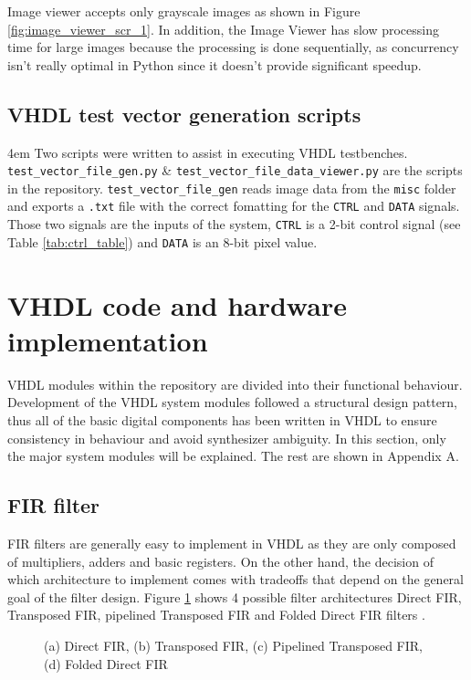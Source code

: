 Image viewer accepts only grayscale images as shown in Figure \ref{fig:image_viewer_scr_1}. In addition, the Image Viewer has slow processing time for large images because the processing is done sequentially, as concurrency isn't really optimal in Python since it doesn't provide significant speedup.


\subsection{VHDL test vector generation scripts}
\emergencystretch 4em%
    {\sloppy
        Two scripts were written to assist in executing VHDL testbenches. \lstinline{test_vector_file_gen.py} \& \lstinline{test_vector_file_data_viewer.py} are the scripts in the repository. \lstinline{test_vector_file_gen} reads image data from the \lstinline{misc} folder and exports a \lstinline{.txt} file with the correct fomatting for the \lstinline{CTRL} and \lstinline{DATA} signals. Those two signals are the inputs of the system, \lstinline{CTRL} is a 2-bit control signal (see Table \ref{tab:ctrl_table}) and \lstinline{DATA} is an 8-bit pixel value.
}

\section{VHDL code and hardware implementation}

VHDL modules within the repository are divided into their functional behaviour. Development of the VHDL system modules followed a structural design pattern, thus all of the basic digital components has been written in VHDL to ensure consistency in behaviour and avoid synthesizer ambiguity. In this section, only the major system modules will be explained. The rest are shown in Appendix A.

\subsection{FIR filter}
FIR filters are generally easy to implement in VHDL as they are only composed of multipliers, adders and basic registers. On the other hand, the decision of which architecture to implement comes with tradeoffs that depend on the general goal of the filter design. Figure \ref{fig:fir_filter_architectures} shows 4 possible filter architectures Direct FIR, Transposed FIR, pipelined Transposed FIR and Folded Direct FIR filters \cite{Akif1256720}.


\begin{figure}[h]
    \centering
    
    \caption{(a) Direct FIR, (b) Transposed FIR, (c) Pipelined Transposed FIR, (d) Folded Direct FIR}
    \label{fig:fir_filter_architectures}
\end{figure}

